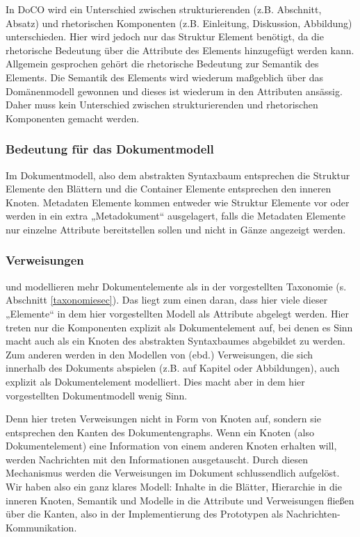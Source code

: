  
In DoCO wird ein Unterschied zwischen strukturierenden (z.B. Abschnitt, Absatz) und rhetorischen Komponenten (z.B. Einleitung, Diskussion, Abbildung) unterschieden. Hier wird jedoch nur das Struktur Element benötigt, da die rhetorische Bedeutung über die Attribute des Elements hinzugefügt werden kann. Allgemein gesprochen gehört die rhetorische Bedeutung zur Semantik des Elements. Die Semantik des Elements wird wiederum maßgeblich über das Domänenmodell gewonnen und dieses ist wiederum in den Attributen ansässig. Daher muss kein Unterschied zwischen strukturierenden und rhetorischen Komponenten gemacht werden.

 
\subsubsection{Bedeutung für das Dokumentmodell}\label{}

 
Im Dokumentmodell, also dem abstrakten Syntaxbaum entsprechen die Struktur Elemente den Blättern und die Container Elemente entsprechen den inneren Knoten. Metadaten Elemente kommen entweder wie Struktur Elemente vor oder werden in ein extra „Metadokument“ ausgelagert, falls die Metadaten Elemente nur einzelne Attribute bereitstellen sollen und nicht in Gänze angezeigt werden.

 
\subsubsection{Verweisungen}\label{}

 
\citep{Peroni} und \citep{NISO} modellieren mehr Dokumentelemente als in der vorgestellten Taxonomie (s. Abschnitt \ref{taxonomiesec}). Das liegt zum einen daran, dass hier viele dieser „Elemente“ in dem hier vorgestellten Modell als Attribute abgelegt werden. Hier treten nur die Komponenten explizit als Dokumentelement auf, bei denen es Sinn macht auch als ein Knoten des abstrakten Syntaxbaumes abgebildet zu werden. Zum anderen werden in den Modellen von (ebd.) Verweisungen, die sich innerhalb des Dokuments abspielen (z.B. auf Kapitel oder Abbildungen), auch explizit als Dokumentelement modelliert. Dies macht aber in dem hier vorgestellten Dokumentmodell wenig Sinn.

 
Denn hier treten Verweisungen nicht in Form von Knoten auf, sondern sie entsprechen den Kanten des Dokumentengraphs. Wenn ein Knoten (also Dokumentelement) eine Information von einem anderen Knoten erhalten will, werden Nachrichten mit den Informationen ausgetauscht. Durch diesen Mechanismus werden die Verweisungen im Dokument schlussendlich aufgelöst. Wir haben also ein ganz klares Modell: Inhalte in die Blätter, Hierarchie in die inneren Knoten, Semantik und Modelle in die Attribute und Verweisungen fließen über die Kanten, also in der Implementierung des Prototypen als Nachrichten-Kommunikation.

